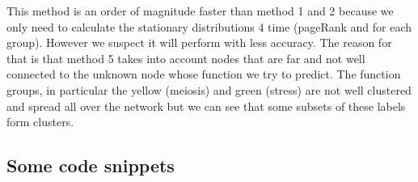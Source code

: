 \begin{itemize}
This method is an order of magnitude faster than method 1 and 2 because we only
need to calculate the stationary distributions 4 time (pageRank and for each
group). However we suspect it will perform with less accuracy.
The reason for that is that method 5 takes into account nodes that are far and not well connected to the
unknown node whose function we try to predict.
The function groups, in particular the yellow (meiosis) and green (stress) are not
well clustered and spread all over the network but we can see that
some subsets of these labels form clusters.

\end{itemize}

\subsection{Some code snippets}

